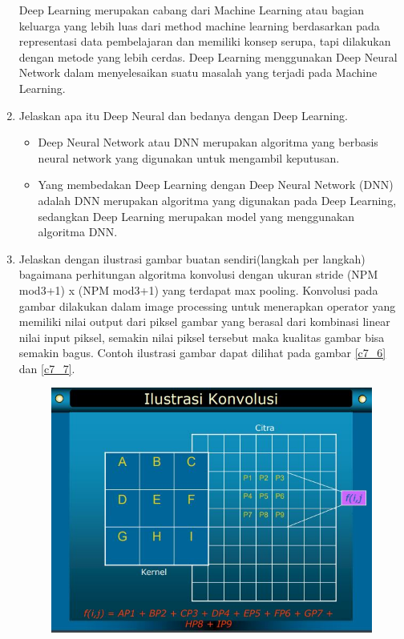 \begin{enumerate}
\subitem Deep Learning merupakan cabang dari Machine Learning atau bagian keluarga yang lebih luas dari method machine learning berdasarkan pada representasi data pembelajaran dan memiliki konsep serupa, tapi dilakukan dengan metode yang lebih cerdas. Deep Learning menggunakan Deep Neural Network dalam menyelesaikan suatu masalah yang terjadi pada Machine Learning.
\item Jelaskan apa itu Deep Neural dan bedanya dengan Deep Learning.
\begin{itemize}
\item Deep Neural Network atau DNN merupakan algoritma yang berbasis neural network yang digunakan untuk mengambil keputusan.
\item Yang membedakan Deep Learning dengan  Deep Neural Network (DNN) adalah DNN merupakan algoritma yang digunakan pada Deep Learning, sedangkan Deep Learning merupakan model yang menggunakan algoritma DNN.
\end{itemize}
\item Jelaskan dengan ilustrasi gambar buatan sendiri(langkah per langkah) bagaimana perhitungan algoritma konvolusi dengan ukuran stride (NPM mod3+1) x (NPM mod3+1) yang terdapat max pooling.
\subitem Konvolusi pada gambar dilakukan dalam image processing untuk menerapkan operator yang memiliki nilai output dari piksel gambar yang berasal dari kombinasi linear nilai input piksel, semakin nilai piksel tersebut maka kualitas gambar bisa semakin bagus. Contoh ilustrasi gambar dapat dilihat pada gambar \ref{c7_6} dan \ref{c7_7}.
\begin{figure}[!htbp]
	\centerline{\includegraphics[width=1\textwidth]{figures/huda/chapter7/6.JPG}}

\end{figure}
\end{enumerate}
